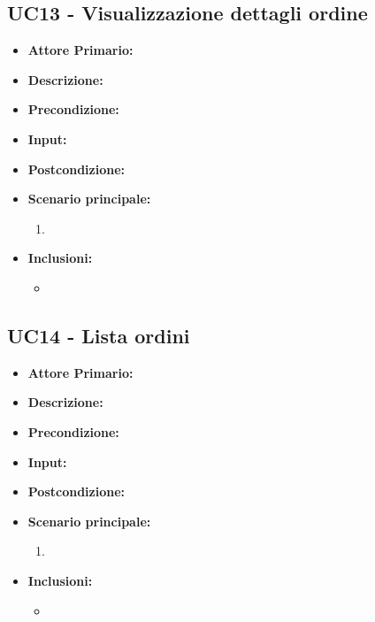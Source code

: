 \subsection{UC13 - Visualizzazione dettagli ordine}
\begin{itemize}
    \item \textbf{Attore Primario:} 
    \item \textbf{Descrizione:}
    \item \textbf{Precondizione:}
    \item \textbf{Input:}
    \item \textbf{Postcondizione:}
    \item \textbf{Scenario principale:}
    \begin{enumerate}
        \item 
    \end{enumerate}
    \item \textbf{Inclusioni:}
    \begin{itemize}
        \item
    \end{itemize}
\end{itemize}
\subsection{UC14 - Lista ordini}
\begin{itemize}
    \item \textbf{Attore Primario:} 
    \item \textbf{Descrizione:}
    \item \textbf{Precondizione:}
    \item \textbf{Input:}
    \item \textbf{Postcondizione:}
    \item \textbf{Scenario principale:}
    \begin{enumerate}
        \item 
    \end{enumerate}
    \item \textbf{Inclusioni:}
    \begin{itemize}
        \item
    \end{itemize}
\end{itemize}
